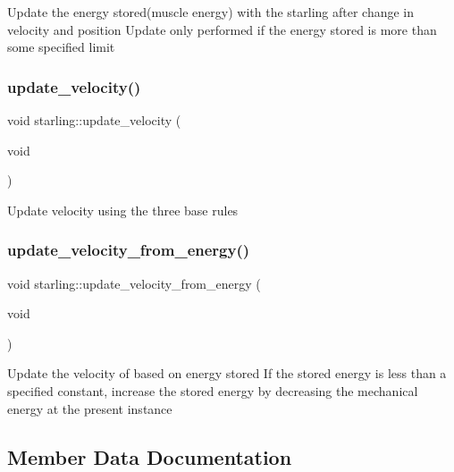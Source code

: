 Update the energy stored(muscle energy) with the starling after change in velocity and position Update only performed if the energy stored is more than some specified limit \mbox{\label{classstarling_ad20f4d47e4042a39771385bee79c07dc}} 
\subsubsection{\texorpdfstring{update\+\_\+velocity()}{update\_velocity()}}
{\footnotesize\ttfamily void starling\+::update\+\_\+velocity (\begin{DoxyParamCaption}\item[{void}]{ }\end{DoxyParamCaption})}

Update velocity using the three base rules \mbox{\label{classstarling_a20bc1b29e16a9e3d1e07bd756a3f2dae}} 
\subsubsection{\texorpdfstring{update\+\_\+velocity\+\_\+from\+\_\+energy()}{update\_velocity\_from\_energy()}}
{\footnotesize\ttfamily void starling\+::update\+\_\+velocity\+\_\+from\+\_\+energy (\begin{DoxyParamCaption}\item[{void}]{ }\end{DoxyParamCaption})}

Update the velocity of based on energy stored If the stored energy is less than a specified constant, increase the stored energy by decreasing the mechanical energy at the present instance 

\subsection{Member Data Documentation}
\mbox{\label{classstarling_ac37c0c0fe85bdeef7370dbe77d77c9ad}} 
